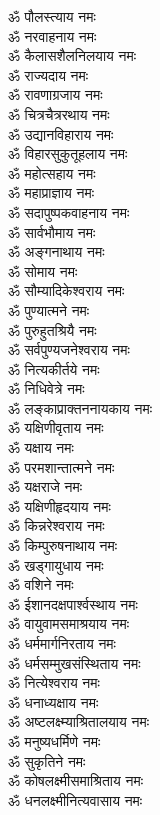 \begin{multicols}{2}
\begin{flushleft}
ॐ पौलस्त्याय नमः\\
ॐ नरवाहनाय नमः\\
ॐ कैलासशैलनिलयाय नमः\\
ॐ राज्यदाय नमः\\
ॐ रावणाग्रजाय नमः\hfill{}\\ %
ॐ चित्रचैत्ररथाय नमः\\
ॐ उद्यानविहाराय नमः\\
ॐ विहारसुकुतूहलाय नमः\\
ॐ महोत्सहाय नमः\\
ॐ महाप्राज्ञाय नमः\\
ॐ सदापुष्पकवाहनाय नमः\\
ॐ सार्वभौमाय नमः\\
ॐ अङ्गनाथाय नमः\\
ॐ सोमाय नमः\\
ॐ सौम्यादिकेश्वराय नमः\hfill{}\\ %
ॐ पुण्यात्मने नमः\\
ॐ पुरुहुतश्रियै नमः\\
ॐ सर्वपुण्यजनेश्वराय नमः\\
ॐ नित्यकीर्तये नमः\\
ॐ निधिवेत्रे नमः\\
ॐ लङ्काप्राक्तननायकाय नमः\\
ॐ यक्षिणीवृताय नमः\\
ॐ यक्षाय नमः\\
ॐ परमशान्तात्मने नमः\\
ॐ यक्षराजे नमः\hfill{}\\ %
ॐ यक्षिणीहृदयाय नमः\\ 
ॐ किन्नरेश्वराय नमः\\
ॐ किम्पुरुषनाथाय नमः\\
ॐ खड्गायुधाय नमः\\
ॐ वशिने नमः\\
ॐ ईशानदक्षपार्श्वस्थाय नमः\\
ॐ वायुवामसमाश्रयाय नमः\\
ॐ धर्ममार्गनिरताय नमः\\
ॐ धर्मसम्मुखसंस्थिताय नमः\\
ॐ नित्येश्वराय नमः\hfill{}\\ %
ॐ धनाध्यक्षाय नमः\\
ॐ अष्टलक्ष्म्याश्रितालयाय नमः\\
ॐ मनुष्यधर्मिणे नमः\\
ॐ सुकृतिने नमः\\
ॐ कोषलक्ष्मीसमाश्रिताय नमः\\
ॐ धनलक्ष्मीनित्यवासाय नमः\\

\end{flushleft}
\end{multicols}
